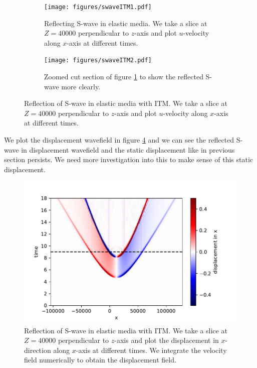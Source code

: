 \begin{figure}[!htpb]
    \begin{subfigure}[t]{0.49\textwidth}   
        \centering 
        \texttt{[image: figures/swaveITM1.pdf]}
        \caption{Reflecting S-wave in elastic media. We take a slice at $Z=40000$ perpendicular to $z$-axis
        and plot $u$-velocity along $x$-axis at different times.}
        \label{subfig:swave}
    \end{subfigure}
    \hfill
    \begin{subfigure}[t]{0.49\textwidth}   
        \centering 
        \texttt{[image: figures/swaveITM2.pdf]}
        \caption{Zoomed cut section of figure \ref{subfig:swave} to show the reflected S-wave more clearly.}
        \label{subfig:swavezoomed}
    \end{subfigure}
    \caption{Reflection of S-wave in elastic media with \ac{ITM}. We take a slice at $Z=40000$ perpendicular to $z$-axis and plot $u$-velocity along $x$-axis at different times.}
    \label{fig:space-timeplot-swave}
\end{figure}
    
We plot the displacement wavefield in figure \ref{fig:space-timeplot-swavedisplacement} and we can see the reflected S- wave in displacement 
wavefield and the static displacement like in previous section persists. We need more investigation into this to make sense of this static displacement.

\begin{figure}[!htpb]
    \centering
    \includegraphics[width=0.85\linewidth]{figures/swaveITMdisplacement.pdf}
    \caption{Reflection of S-wave in elastic media with \ac{ITM}. We take a slice at $Z=40000$ perpendicular to $z$-axis
    and plot the displacement in $x$-direction along $x$-axis at different times. We integrate the velocity field numerically to obtain the displacement field.}
    \label{fig:space-timeplot-swavedisplacement}
\end{figure}


